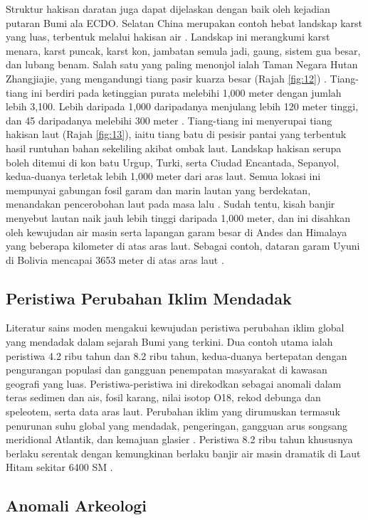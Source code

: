 \documentclass[10pt,twocolumn,letterpaper]{article}
\begin{document}
Struktur hakisan daratan juga dapat dijelaskan dengan baik oleh kejadian putaran Bumi ala ECDO. Selatan China merupakan contoh hebat landskap karst yang luas, terbentuk melalui hakisan air \cite{82}. Landskap ini merangkumi karst menara, karst puncak, karst kon, jambatan semula jadi, gaung, sistem gua besar, dan lubang benam. Salah satu yang paling menonjol ialah Taman Negara Hutan Zhangjiajie, yang mengandungi tiang pasir kuarza besar (Rajah \ref{fig:12}) \cite{84}. Tiang-tiang ini berdiri pada ketinggian purata melebihi 1,000 meter dengan jumlah lebih 3,100. Lebih daripada 1,000 daripadanya menjulang lebih 120 meter tinggi, dan 45 daripadanya melebihi 300 meter \cite{85}. Tiang-tiang ini menyerupai tiang hakisan laut (Rajah \ref{fig:13}), iaitu tiang batu di pesisir pantai yang terbentuk hasil runtuhan bahan sekeliling akibat ombak laut. Landskap hakisan serupa boleh ditemui di kon batu Urgup, Turki, serta Ciudad Encantada, Sepanyol, kedua-duanya terletak lebih 1,000 meter dari aras laut. Semua lokasi ini mempunyai gabungan fosil garam dan marin lautan yang berdekatan, menandakan pencerobohan laut pada masa lalu \cite{15,86,87}. Sudah tentu, kisah banjir \cite{3} menyebut lautan naik jauh lebih tinggi daripada 1,000 meter, dan ini disahkan oleh kewujudan air masin serta lapangan garam besar di Andes dan Himalaya yang beberapa kilometer di atas aras laut. Sebagai contoh, dataran garam Uyuni di Bolivia mencapai 3653 meter di atas aras laut \cite{94}.

\subsection{Peristiwa Perubahan Iklim Mendadak}

Literatur sains moden mengakui kewujudan peristiwa perubahan iklim global yang mendadak dalam sejarah Bumi yang terkini. Dua contoh utama ialah peristiwa 4.2 ribu tahun dan 8.2 ribu tahun, kedua-duanya bertepatan dengan pengurangan populasi dan gangguan penempatan masyarakat di kawasan geografi yang luas. Peristiwa-peristiwa ini direkodkan sebagai anomali dalam teras sedimen dan ais, fosil karang, nilai isotop O18, rekod debunga dan speleotem, serta data aras laut. Perubahan iklim yang dirumuskan termasuk penurunan suhu global yang mendadak, pengeringan, gangguan arus songsang meridional Atlantik, dan kemajuan glasier \cite{90,91,92}. Peristiwa 8.2 ribu tahun khususnya berlaku serentak dengan kemungkinan berlaku banjir air masin dramatik di Laut Hitam sekitar 6400 SM \cite{93}.

\subsection{Anomali Arkeologi}
\end{document}
